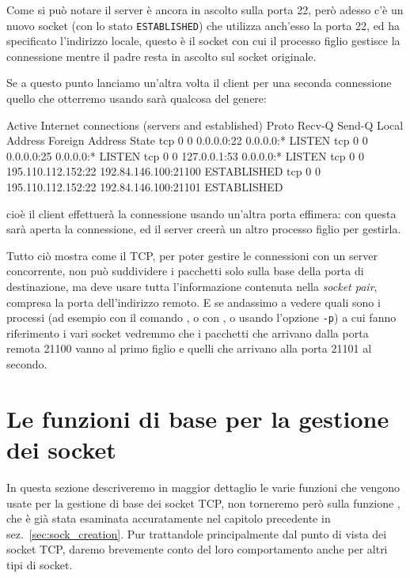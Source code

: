 Come si può notare il server è ancora in ascolto sulla porta 22, però adesso
c'è un nuovo socket (con lo stato \texttt{ESTABLISHED}) che utilizza anch'esso
la porta 22, ed ha specificato l'indirizzo locale, questo è il socket con cui
il processo figlio gestisce la connessione mentre il padre resta in ascolto
sul socket originale.

Se a questo punto lanciamo un'altra volta il client  per una seconda
connessione quello che otterremo usando  sarà qualcosa del
genere:
\begin{Terminal}
Active Internet connections (servers and established)
Proto Recv-Q Send-Q Local Address           Foreign Address         State      
tcp        0      0 0.0.0.0:22              0.0.0.0:*               LISTEN
tcp        0      0 0.0.0.0:25              0.0.0.0:*               LISTEN
tcp        0      0 127.0.0.1:53            0.0.0.0:*               LISTEN
tcp        0      0 195.110.112.152:22      192.84.146.100:21100    ESTABLISHED
tcp        0      0 195.110.112.152:22      192.84.146.100:21101    ESTABLISHED
\end{Terminal}
cioè il client effettuerà la connessione usando un'altra porta effimera: con
questa sarà aperta la connessione, ed il server creerà un altro processo
figlio per gestirla.

Tutto ciò mostra come il TCP, per poter gestire le connessioni con un server
concorrente, non può suddividere i pacchetti solo sulla base della porta di
destinazione, ma deve usare tutta l'informazione contenuta nella
\textit{socket pair}, compresa la porta dell'indirizzo remoto.  E se andassimo
a vedere quali sono i processi (ad esempio con il comando , o con
, o usando l'opzione \texttt{-p}) a cui fanno riferimento i vari
socket vedremmo che i pacchetti che arrivano dalla porta remota 21100 vanno al
primo figlio e quelli che arrivano alla porta 21101 al secondo.


\section{Le funzioni di base per la gestione dei socket}
\label{sec:TCP_functions}

In questa sezione descriveremo in maggior dettaglio le varie funzioni che
vengono usate per la gestione di base dei socket TCP, non torneremo però sulla
funzione , che è già stata esaminata accuratamente nel capitolo
precedente in sez.~\ref{sec:sock_creation}. Pur trattandole principalmente dal
punto di vista dei socket TCP, daremo brevemente conto del loro comportamento
anche per altri tipi di socket.


